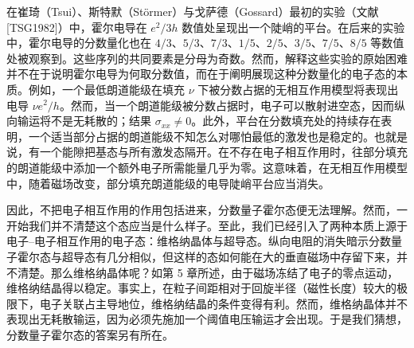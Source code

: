在崔琦（Tsui）、斯特默（Störmer）与戈萨德（Gossard）最初的实验（文献 [TSG1982]）中，霍尔电导在 $e^{2}/3h$ 数值处呈现出一个陡峭的平台。在后来的实验中，霍尔电导的分数量化也在 $4/3$、$5/3$、$7/3$、$1/5$、$2/5$、$3/5$、$7/5$、$8/5$ 等数值处被观察到。这些序列的共同要素是分母为奇数。然而，解释这些实验的原始困难并不在于说明霍尔电导为何取分数值，而在于阐明展现这种分数量化的电子态的本质。例如，一个最低朗道能级在填充 $\nu$ 下被分数占据的无相互作用模型将表现出电导 $\nu e^{2}/h$。然而，当一个朗道能级被分数占据时，电子可以散射进空态，因而纵向输运将不是无耗散的；结果 $\sigma_{xx}\neq 0$。此外，平台在分数填充处的持续存在表明，一个适当部分占据的朗道能级不知怎么对哪怕最低的激发也是稳定的。也就是说，有一个能隙把基态与所有激发态隔开。在不存在电子相互作用时，往部分填充的朗道能级中添加一个额外电子所需能量几乎为零。这意味着，在无相互作用模型中，随着磁场改变，部分填充朗道能级的电导陡峭平台应当消失。

因此，不把电子相互作用的作用包括进来，分数量子霍尔态便无法理解。然而，一开始我们并不清楚这个态应当是什么样子。至此，我们已经引入了两种本质上源于电子–电子相互作用的电子态：维格纳晶体与超导态。纵向电阻的消失暗示分数量子霍尔态与超导态有几分相似，但这样的态如何能在大的垂直磁场中存留下来，并不清楚。那么维格纳晶体呢？如第 5 章所述，由于磁场冻结了电子的零点运动，维格纳结晶得以稳定。事实上，在粒子间距相对于回旋半径（磁性长度）较大的极限下，电子关联占主导地位，维格纳结晶的条件变得有利。然而，维格纳晶体并不表现出无耗散输运，因为必须先施加一个阈值电压输运才会出现。于是我们猜想，分数量子霍尔态的答案另有所在。

